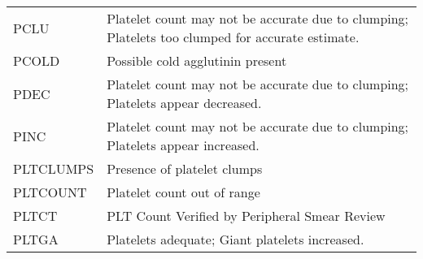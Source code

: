 \begin{fullwidth}
\begin{longtable}{p{.20\linewidth} p{.75\linewidth}}
PCLU        & Platelet count may not be accurate due to clumping; Platelets too clumped for accurate estimate.                                                                                                                                                                                             \\
PCOLD       & Possible cold agglutinin present                                                                                                                                                                                                                                                             \\
PDEC        & Platelet count may not be accurate due to clumping; Platelets appear decreased.                                                                                                                                                                                                              \\
PINC        & Platelet count may not be accurate due to clumping; Platelets appear increased.                                                                                                                                                                                                              \\
PLTCLUMPS   & Presence of platelet clumps                                                                                                                                                                                                                                                                  \\
PLTCOUNT    & Platelet count out of range                                                                                                                                                                                                                                                                  \\
PLTCT       & PLT Count Verified by Peripheral Smear Review                                                                                                                                                                                                                                                \\
PLTGA       & Platelets adequate; Giant platelets increased.                                                                                                                                                                                                                                               \\

\end{longtable}
\end{fullwidth}
